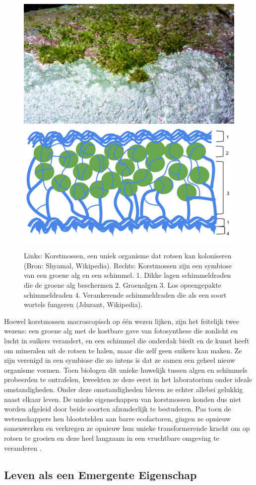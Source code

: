 \documentclass[
  11pt,
]{book}
\begin{document}
\begin{figure}

{\centering \includegraphics[width=0.45\linewidth]{./figs/lichen} \includegraphics[width=0.45\linewidth]{./figs/LichenDiagram} 

}

\caption{Links: Korstmossen, een uniek organisme dat rotsen kan koloniseren (Bron: Shyamal, Wikipedia). Rechts: Korstmossen zijn een symbiose van een groene alg en een schimmel. 1. Dikke lagen schimmeldraden die de groene alg beschermen 2. Groenalgen 3. Los opeengepakte schimmeldraden 4. Verankerende schimmeldraden die als een soort wortels fungeren (Jdurant, Wikipedia).}\label{fig:lichen}
\end{figure}

Hoewel korstmossen macroscopisch op één wezen lijken, zijn het feitelijk twee wezens: een groene alg met de kostbare gave van fotosynthese die zonlicht en lucht in suikers verandert, en een schimmel die onderdak biedt en de kunst heeft om mineralen uit de rotsen te halen, maar die zelf geen suikers kan maken. Ze zijn verenigd in een symbiose die zo intens is dat ze samen een geheel nieuw organisme vormen. Toen biologen dit unieke huwelijk tussen algen en schimmels probeerden te ontrafelen, kweekten ze deze eerst in het laboratorium onder ideale omstandigheden. Onder deze omstandigheden bleven ze echter allebei gelukkig naast elkaar leven. De unieke eigenschappen van korstmossen konden dus niet worden afgeleid door beide soorten afzonderlijk te bestuderen. Pas toen de wetenschappers hen blootstelden aan barre ecofactoren, gingen ze opnieuw samenwerken en verkregen ze opnieuw hun unieke transformerende kracht om op rotsen te groeien en deze heel langzaam in een vruchtbare omgeving te veranderen \citep{Kimmerer2013}.

\hypertarget{leven-als-een-emergente-eigenschap}{%
\subsection{Leven als een Emergente Eigenschap}\label{leven-als-een-emergente-eigenschap}}
\end{document}
